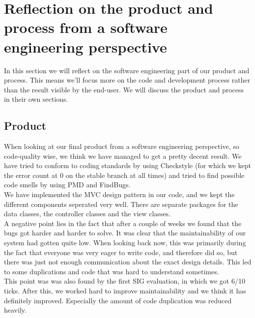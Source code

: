 \section{Reflection on the product and process from a software engineering perspective}

In this section we will reflect on the software engineering part of our product and process. This means we'll focus more on the code and development process rather than the result visible by the end-user. We will discuss the product and process in their own sections.

\subsection*{Product}
When looking at our final product from a software engineering perspective, so code-quality wise, we think we have managed to get a pretty decent result. We have tried to conform to coding standards by using Checkstyle (for which we kept the error count at 0 on the stable branch at all times) and tried to find possible code smells by using PMD and FindBugs.\\
We have implemented the MVC design pattern in our code, and we kept the different components seperated very well. There are separate packages for the data classes, the controller classes and the view classes.\\
A negative point lies in the fact that after a couple of weeks we found that the bugs got harder and harder to solve. It was clear that the maintainability of our system had gotten quite low. When looking back now, this was primarily during the fact that everyone was very eager to write code, and therefore did so, but there was just not enough communication about the exact design details. This led to some duplications and code that was hard to understand sometimes.\\
This point was was also found by the first SIG evaluation, in which we got 6/10 ticks. After this, we worked hard to improve maintainability and we think it has definitely improved. Especially the amount of code duplication was reduced heavily.\\





